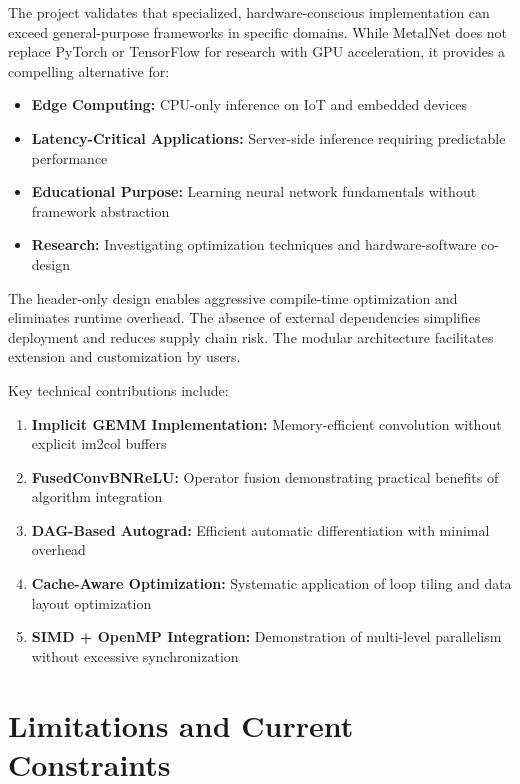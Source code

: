 \documentclass[12pt,oneside,a4paper]{report}
\begin{document}
The project validates that specialized, hardware-conscious implementation can exceed general-purpose frameworks in specific domains. While MetalNet does not replace PyTorch or TensorFlow for research with GPU acceleration, it provides a compelling alternative for:

\begin{itemize}
    \item \textbf{Edge Computing:} CPU-only inference on IoT and embedded devices
    \item \textbf{Latency-Critical Applications:} Server-side inference requiring predictable performance
    \item \textbf{Educational Purpose:} Learning neural network fundamentals without framework abstraction
    \item \textbf{Research:} Investigating optimization techniques and hardware-software co-design
\end{itemize}

The header-only design enables aggressive compile-time optimization and eliminates runtime overhead. The absence of external dependencies simplifies deployment and reduces supply chain risk. The modular architecture facilitates extension and customization by users.

Key technical contributions include:

\begin{enumerate}
    \item \textbf{Implicit GEMM Implementation:} Memory-efficient convolution without explicit im2col buffers
    \item \textbf{FusedConvBNReLU:} Operator fusion demonstrating practical benefits of algorithm integration
    \item \textbf{DAG-Based Autograd:} Efficient automatic differentiation with minimal overhead
    \item \textbf{Cache-Aware Optimization:} Systematic application of loop tiling and data layout optimization
    \item \textbf{SIMD + OpenMP Integration:} Demonstration of multi-level parallelism without excessive synchronization
\end{enumerate}

\section{Limitations and Current Constraints}
\end{document}
